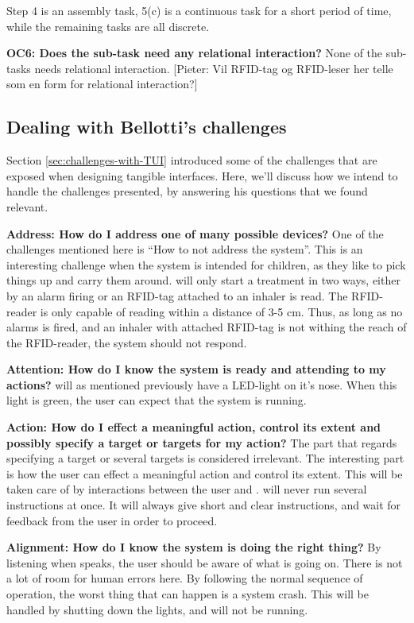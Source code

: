 Step 4 is an assembly task, 5(c) is a continuous task for a short period of time, while the remaining tasks are all discrete.  

\textbf{OC6: Does the sub-task need any relational interaction?}
None of the sub-tasks needs relational interaction.
[Pieter: Vil RFID-tag og RFID-leser her telle som en form for relational interaction?]
 
\subsection{Dealing with Bellotti's challenges}

Section \ref{sec:challenges-with-TUI} introduced some of the challenges that are exposed when designing tangible interfaces. Here, we'll discuss how we intend to handle the challenges presented, by answering his questions that we found relevant. 

\textbf{Address: How do I address one of many possible devices?}
One of the challenges mentioned here is ``How to not address the system''. This is an interesting challenge when the system is intended for children, as they like to pick things up and carry them around. \buddy{} will only start a treatment in two ways, either by an alarm firing or an RFID-tag attached to an inhaler is read. The RFID-reader is only capable of reading within a distance of 3-5 cm. Thus, as long as no alarms is fired, and an inhaler with attached RFID-tag is not withing the reach of the RFID-reader, the system should not respond.  

\textbf{Attention: How do I know the system is ready and attending to my actions?}
\buddy{} will as mentioned previously have a LED-light on it's nose. When this light is green, the user can expect that the system is running. 

\textbf{Action: How do I effect a meaningful action, control its extent and possibly specify a target or targets for my action?}
The part that regards specifying a target or several targets is considered irrelevant. The interesting part is how the user can effect a meaningful action and control its extent. This will be taken care of by interactions between the user and \buddy{}. \buddy{} will never run several instructions at once. It will always give short and clear instructions, and wait for feedback from the user in order to proceed. 

\textbf{Alignment: How do I know the system is doing the right thing?}
By listening when \buddy{} speaks, the user should be aware of what is going on. There is not a lot of room for human errors here. By following the normal sequence of operation, the worst thing that can happen is a system crash. This will be handled by shutting down the lights, and \buddy{} will not be running.  

